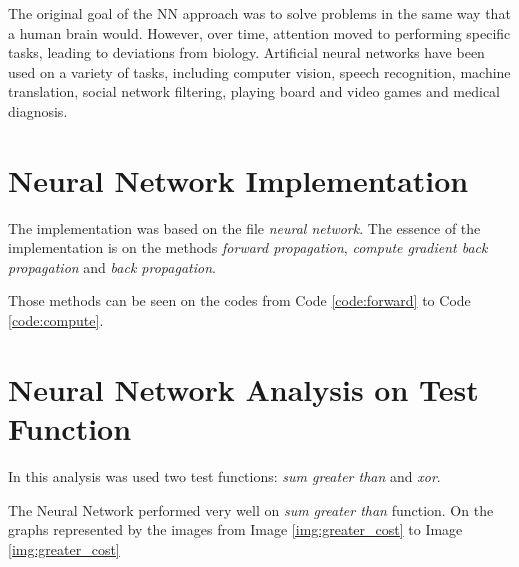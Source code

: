 \documentclass[journal]{IEEEtran}
\begin{document}
The original goal of the NN approach was to solve problems in the same way that a human brain would. However, over time, attention moved to performing specific tasks, leading to deviations from biology. Artificial neural networks have been used on a variety of tasks, including computer vision, speech recognition, machine translation, social network filtering, playing board and video games and medical diagnosis.

\section{Neural Network Implementation}

The implementation was based on the file \textit{neural network}. The essence of the implementation is on the methods \textit{forward propagation}, \textit{compute gradient back propagation} and \textit{back propagation}.

Those methods can be seen on the codes from Code \ref{code:forward} to Code \ref{code:compute}.







\section{Neural Network Analysis on Test Function}

In this analysis was used two test functions: \textit{sum greater than} and \textit{xor}.

The Neural Network performed very well on \textit{sum greater than} function. On the graphs represented by the images from Image \ref{img:greater_cost} to Image \ref{img:greater_cost}
\end{document}
